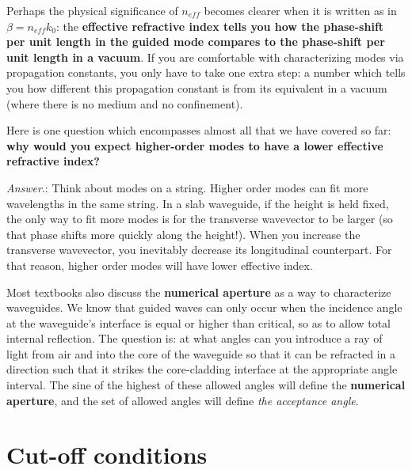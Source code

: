 Perhaps the physical significance of $n_{eff}$ becomes clearer when it is written as in $\beta=n_{eff}k_0$: the \textbf{effective refractive index tells you how the phase-shift per unit length in the guided mode compares to the phase-shift per unit length in a vacuum}. If you are comfortable with characterizing modes via propagation constants, you only have to take one extra step: a number which tells you how different this propagation constant is from its equivalent in a vacuum (where there is no medium and no confinement).

Here is one question which encompasses almost all that we have covered so far: \textbf{why would you expect higher-order modes to have a lower effective refractive index?}

\noindent \textit{Answer}.: Think about modes on a string. Higher order modes can fit more wavelengths in the same string. In a slab waveguide, if the height is held fixed, the only way to fit more modes is for the transverse wavevector to be larger (so that phase shifts more quickly along the height!). When you increase the transverse wavevector, you inevitably decrease its longitudinal counterpart. For that reason, higher order modes will have lower effective index.

Most textbooks also discuss the \textbf{numerical aperture} as a way to characterize waveguides. We know that guided waves can only occur when the incidence angle at the waveguide's interface is equal or higher than critical, so as to allow total internal reflection. The question is: at what angles can you introduce a ray of light from air and into the core of the waveguide so that it can be refracted in a direction such that it strikes the core-cladding interface at the appropriate angle interval. The sine of the highest of these allowed angles will define the \textbf{numerical aperture}, and the set of allowed angles will define \textit{the acceptance angle}.

\section{Cut-off conditions}

